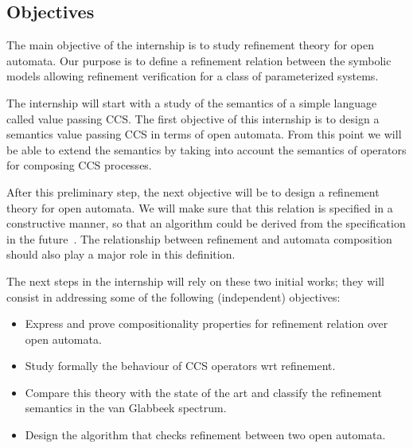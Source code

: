 \documentclass[11pt,fleqn]{article}
\begin{document}
\subsection*{Objectives}


The main objective of the internship is to study refinement theory for open automata.  
Our purpose is to define a refinement relation between the symbolic models allowing refinement verification for a class of parameterized systems.

The internship will start with a study of the semantics of a simple language called value passing CCS. The first objective of this internship is to design a semantics value passing CCS in terms of open automata. From this point we will be able to extend the semantics by taking into account the semantics of operators for composing CCS processes.

After this preliminary step, the next objective will be to design a refinement theory for open automata. We will make sure that this relation is specified in a constructive manner, so that an algorithm could be derived from the specification in the future~\cite{Bellegarde:MEMOCODE2003}.
The relationship between refinement and automata composition should also play a major role in this definition.



The next steps in the internship will rely on these two initial works; they will consist in addressing some of the following (independent) objectives:
\begin{itemize}
\item Express and prove compositionality properties for refinement relation over open automata.
\item Study formally the behaviour of CCS operators wrt refinement.
\item Compare this theory with the state of the art and classify the refinement semantics in the van Glabbeek spectrum.
\item Design the algorithm that checks refinement between two open automata.
\end{itemize}
\end{document}
